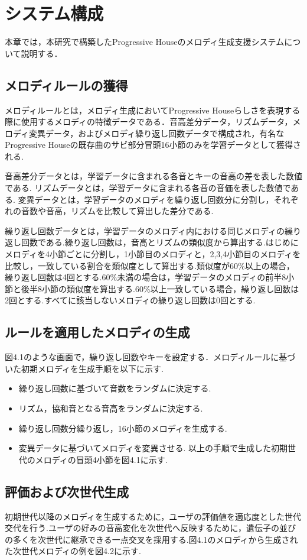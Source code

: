 \chapter{システム構成}
本章では，本研究で構築したProgressive Houseのメロディ生成支援システムについて説明する．

\section{メロディルールの獲得}
メロディルールとは，メロディ生成においてProgressive Houseらしさを表現する際に使用するメロディの特徴データである．音高差分データ，リズムデータ，メロディ変異データ，およびメロディ繰り返し回数データで構成され，有名なProgressive Houseの既存曲のサビ部分冒頭16小節のみを学習データとして獲得される.

音高差分データとは，学習データに含まれる各音とキーの音高の差を表した数値である.
リズムデータとは，学習データに含まれる各音の音価を表した数値である.
変異データとは，学習データのメロディを繰り返し回数分に分割し，それぞれの音数や音高，リズムを比較して算出した差分である.

繰り返し回数データとは，学習データのメロディ内における同じメロディの繰り返し回数である.繰り返し回数は，音高とリズムの類似度から算出する.はじめにメロディを4小節ごとに分割し，1小節目のメロディと，2,3,4小節目のメロディを比較し，一致している割合を類似度として算出する.類似度が60\%以上の場合，繰り返し回数は4回とする.60\%未満の場合は，学習データのメロディの前半8小節と後半8小節の類似度を算出する.60\%以上一致している場合，繰り返し回数は2回とする.すべてに該当しないメロディの繰り返し回数は0回とする.

\section{ルールを適用したメロディの生成}
図4.1のような画面で，繰り返し回数やキーを設定する．メロディルールに基づいた初期メロディを生成手順を以下に示す.
\begin{itemize}
  \item 繰り返し回数に基づいて音数をランダムに決定する.
  \item リズム，協和音となる音高をランダムに決定する.
  \item 繰り返し回数分繰り返し，16小節のメロディを生成する.
  \item 変異データに基づいてメロディを変異させる. 以上の手順で生成した初期世代のメロディの冒頭4小節を図4.1に示す.
\end{itemize}

\section{評価および次世代生成}
初期世代以降のメロディを生成するために，ユーザの評価値を適応度とした世代交代を行う.ユーザの好みの音高変化を次世代へ反映するために，遺伝子の並びの多くを次世代に継承できる一点交叉を採用する.図4.1のメロディから生成された次世代メロディの例を図4.2に示す.

